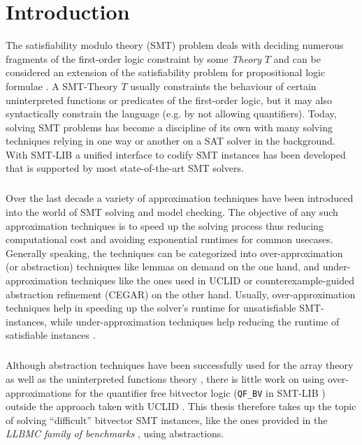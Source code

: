 \chapter{Introduction}
\label{ch:introduction}
The satisfiability modulo theory (SMT) problem deals with deciding numerous fragments of the first-order logic constraint by some \textit{Theory} $T$ \cite{Barrett-Tinelli-SMT} and can be considered an extension of the satisfiability problem for propositional logic formulae \cite{Marques-Silva-PropositionalSATSolving}.
A SMT-Theory $T$ usually constraints the behaviour of certain uninterpreted functions or predicates of the first-order logic, but it may also syntactically constrain the language (e.g. by not allowing quantifiers).
Today, solving SMT problems has become a discipline of its own with many solving techniques relying in one way or another on a SAT solver in the background.
With SMT-LIB \cite{BarFT-SMTLIB} a unified interface to codify SMT instances has been developed that is supported by most state-of-the-art SMT solvers.
\paragraph{}
Over the last decade a variety of approximation techniques have been introduced into the world of SMT solving and model checking.
The objective of any such approximation techniques is to speed up the solving process thus reducing computational cost and avoiding exponential runtimes for common usecases.
Generally speaking, the techniques can be categorized into over-approximation (or abstraction) techniques like lemmas on demand \cite{p6-brummayer} on the one hand, and under-approximation techniques like the ones used in UCLID \cite{Bryant2007_Chapter_DecidingBit-VectorArithmeticWi-UCLID} or counterexample-guided abstraction refinement (CEGAR) \cite{CEGAR} on the other hand.
Usually, over-approximation techniques help in speeding up the solver's runtime for unsatisfiable SMT-instances, while under-approximation techniques help reducing the runtime of satisfiable instances \cite{Brummayer-PhD}. 
\paragraph{}
Although abstraction techniques have been successfully used for the array theory \cite{p6-brummayer} as well as the uninterpreted functions theory \cite{PreinerNiemetzBiere-DIFTS13,NiemetzPreinerBiere-FMCAD14}, there is little work on using over-approximations for the quantifier free bitvector logic (\texttt{QF\_BV} in SMT-LIB \cite{BarFT-SMTLIB}) outside the approach taken with UCLID \cite{Bryant2007_Chapter_DecidingBit-VectorArithmeticWi-UCLID}.
This thesis therefore takes up the topic of solving \enquote{difficult} bitvector SMT instances, like the ones provided in the \textit{LLBMC family of benchmarks} \cite{sc2017-proceedings}, using abstractions.

